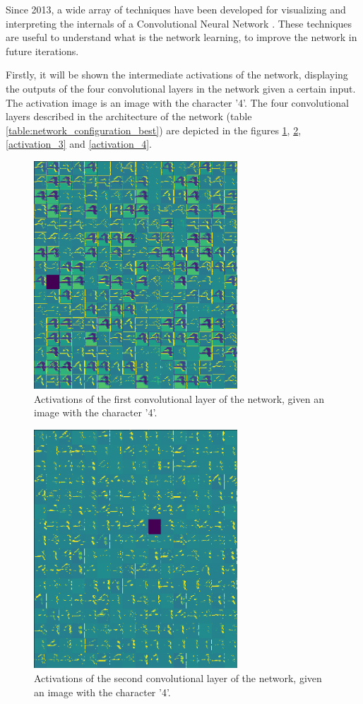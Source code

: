 \documentclass[journal]{IEEEtran}
\begin{document}
Since 2013, a wide array of techniques have been developed for visualizing and interpreting the internals of a Convolutional Neural Network \cite{10.1007/978-3-319-10590-1_53}. These techniques are useful to understand what is the network learning, to improve the network in future iterations.

Firstly, it will be shown the intermediate activations of the network, displaying the outputs of the four convolutional layers in the network given a certain input. The activation image is an image with the character '4'. The four convolutional layers described in the architecture of the network (table \ref{table:network_configuration_best}) are depicted in the figures \ref{activation_1}, \ref{activation_2}, \ref{activation_3} and \ref{activation_4}.

\begin{figure}[!t]
\centering
\includegraphics[width=3in]{images/activation_conv1_4.png}
\caption{Activations of the first convolutional layer of the network, given an image with the character '4'.}
\label{activation_1}
\end{figure}

\begin{figure}[!t]
\centering
\includegraphics[width=3in]{images/activation_conv2_4.png}
\caption{Activations of the second convolutional layer of the network, given an image with the character '4'.}
\label{activation_2}
\end{figure}
\end{document}
